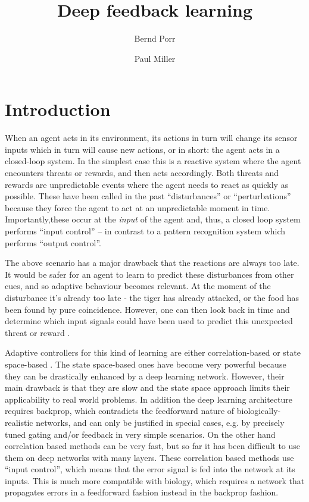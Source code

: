\documentclass{llncs}
\title{Deep feedback learning}
\author{Bernd Porr \and Paul Miller}
\institute{Glasgow Neuro, bernd,paul@glasgowneuro.tech}
\begin{document}
\maketitle

\begin{abstract}
\end{abstract}

\section{Introduction}
When an agent acts in its environment, its actions in turn will
change its sensor inputs which in turn will cause new actions, or in
short: the agent acts in a closed-loop system. In the simplest case this
is a reactive system where the agent encounters threats or rewards, and
then acts accordingly. Both threats and rewards are unpredictable events
where the agent needs to react as quickly as possible. These have been
called in the past ``disturbances'' or ``perturbations'' because they force
the agent to act at an unpredictable moment in time. Importantly,these
occur at the \textsl{input} of the agent and, thus, a closed loop system
performs ``input control'' -- in contrast to a pattern recognition system
which performs ``output control''.

The above scenario has a major drawback that the reactions are always
too late.  It would be safer for an agent to learn to predict these
disturbances from other cues, and so adaptive behaviour becomes
relevant. At the moment of the disturbance it's already too late - the
tiger has already attacked, or the food has been found by pure
coincidence. However, one can then look back in time and determine
which input signals could have been used to predict this unexpected
threat or reward \cite{Sutton98,Woergoetter2005,PorrNecoInvco2003}.

Adaptive controllers for this kind of learning are either
correlation-based \cite{PorrNecoISO2003,Verschure91} or state
space-based \cite{Dayan1992,Sutton98}. The state space-based ones
have become very powerful because they can be drastically enhanced by
a deep learning network. However, their main drawback is that they are
slow and the state space approach limits their applicability to real
world problems. In addition the deep learning architecture requires
backprop, which contradicts the feedforward nature of
biologically-realistic networks, and can only be justified in special
cases, e.g. by precisely tuned gating and/or feedback in very simple
scenarios. On the other hand correlation based methods can be very
fast, but so far it has been difficult to use them on deep networks
with many layers.  These correlation based methods use ``input
control'', which means that the error signal is fed into the network
at its inputs. This is much more compatible with biology, which
requires a network that propagates errors in a feedforward fashion
instead in the backprop fashion.
\end{document}
